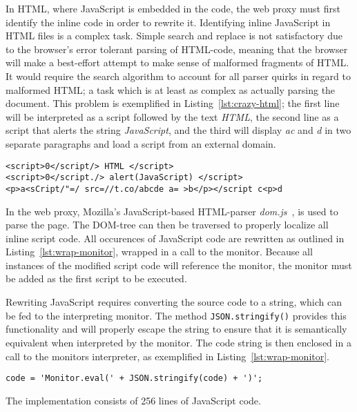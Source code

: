 \documentclass{llncs}
\begin{document}
In HTML, where 
JavaScript is embedded in the code, the web proxy must first identify 
the inline code in order to rewrite it.
Identifying inline JavaScript in HTML files is a complex task. 
Simple search and replace is not satisfactory due to the browser's error tolerant parsing of HTML-code, meaning that the 
browser will make a best-effort attempt to make sense of malformed fragments of 
HTML. It would require the search 
algorithm to account for all parser quirks in regard to malformed HTML;
a task which is at least as complex as actually parsing the document.
This problem is exemplified in Listing~\ref{lst:crazy-html}; the first line
will be interpreted as a script followed by the text \emph{HTML}, the second
line as a script that alerts the string \emph{JavaScript}, and the third will 
display \emph{ac} and \emph{d} in two separate paragraphs and load a script
from an external domain.

\begin{lstlisting}[language=langsmall,label=lst:crazy-html, caption=Example of complicated HTML]
<script>0</script/> HTML </script>
<script>0</script./> alert(JavaScript) </script>
<p>a<sCript/"=/ src=//t.co/abcde a= >b</p></script c<p>d
\end{lstlisting}


In the web proxy, Mozilla's JavaScript-based HTML-parser \emph{dom.js}~\cite{Mozilla:dom.js}, is used 
to parse the page. The DOM-tree can then be traversed to properly localize 
all inline script code. All occurences of JavaScript code are rewritten as 
outlined in Listing~\ref{lst:wrap-monitor}, wrapped in a call to the monitor.
Because all instances of the modified script code will reference the monitor, 
the monitor must be added as the first script to be executed.


Rewriting JavaScript requires converting the source code to a string, which can 
be fed to the interpreting monitor. The method \lstinline{JSON.stringify()} 
provides this functionality and will properly escape the string to ensure that 
it is semantically equivalent when interpreted by the monitor. The code string is then enclosed in a call to the monitors 
interpreter, as exemplified in Listing~\ref{lst:wrap-monitor}.
\begin{lstlisting}[language=langsmall,label=lst:wrap-monitor, caption=Example of monitor wrapping]
code = 'Monitor.eval(' + JSON.stringify(code) + ')';
\end{lstlisting}
The implementation consists of 256 lines of JavaScript code.
\end{document}
